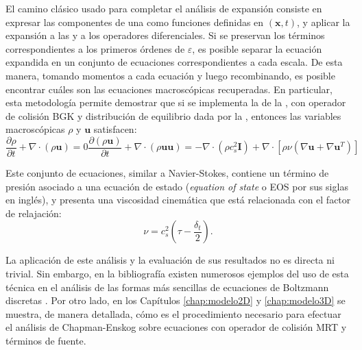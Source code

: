 El camino cl\'asico usado para completar el an\'alisis de expansi\'on consiste en expresar las componentes de una \lbe{} como funciones definidas en $(\bm{x},t)$, y aplicar la expansi\'on a las \fdp{} y a los operadores diferenciales. Si se preservan los t\'erminos correspondientes a los primeros \'ordenes de $\varepsilon$, es posible separar la ecuaci\'on expandida en un conjunto de ecuaciones correspondientes a cada escala. De esta manera, tomando momentos a cada ecuaci\'on y luego recombinando, es posible encontrar cu\'ales son las ecuaciones macrosc\'opicas recuperadas. En particular, esta metodolog\'ia permite demostrar que si se implementa la \lbe{} de la , con operador de colisi\'on BGK y distribuci\'on de equilibrio dada por la , entonces las variables macrosc\'opicas $\rho$ y $\bm{u}$ satisfacen:
\begin{subequations}
	\begin{equation}
		\dfrac{\partial \rho}{\partial t}  + \nabla \cdot (\rho \bm{u})=0
	\end{equation}
	\begin{equation}
	\dfrac{\partial (\rho \bm{u})}{\partial t}  + \nabla \cdot (\rho \bm{u}\bm{u})=-\nabla \cdot (\rho c_s^2 \bm{I}) + \nabla \cdot [\rho \nu (\nabla \bm{u}+\nabla \bm{u}^T)]
	\end{equation}
\end{subequations}

Este conjunto de ecuaciones, similar a Navier-Stokes, contiene un t\'ermino de presi\'on asociado a una ecuaci\'on de estado (\emph{equation of state} o EOS por sus siglas en ingl\'es), y presenta una viscosidad cinem\'atica que est\'a relacionada con el factor de relajaci\'on:
\begin{equation}
	\nu = c_s^2 \left( \tau - \dfrac{\delta_t}{2} \right).
\end{equation}

La aplicaci\'on de este an\'alisis y la evaluaci\'on de sus resultados no es directa ni trivial. Sin embargo, en la bibliograf\'ia existen numerosos ejemplos del uso de esta t\'ecnica en el an\'alisis de las formas m\'as sencillas de ecuaciones de Boltzmann discretas \cite{kruger_lattice_2017, succi_lattice_2001, succi_lattice_2018, guo_lattice_2013}. Por otro lado, en los Cap\'itulos \ref{chap:modelo2D} y \ref{chap:modelo3D} se muestra, de manera detallada, c\'omo es el procedimiento necesario para efectuar el an\'alisis de Chapman-Enskog sobre ecuaciones con operador de colisi\'on MRT y t\'erminos de fuente.

